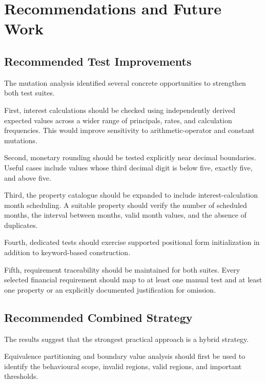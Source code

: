 \documentclass[12pt]{article}
\begin{document}

\section{Recommendations and Future Work}

\subsection{Recommended Test Improvements}

The mutation analysis identified several concrete opportunities to strengthen
both test suites.

First, interest calculations should be checked using independently derived
expected values across a wider range of principals, rates, and calculation
frequencies. This would improve sensitivity to arithmetic-operator and
constant mutations.

Second, monetary rounding should be tested explicitly near decimal boundaries.
Useful cases include values whose third decimal digit is below five, exactly
five, and above five.

Third, the property catalogue should be expanded to include
interest-calculation month scheduling. A suitable property should verify the
number of scheduled months, the interval between months, valid month values,
and the absence of duplicates.

Fourth, dedicated tests should exercise supported positional form
initialization in addition to keyword-based construction.

Fifth, requirement traceability should be maintained for both suites. Every
selected financial requirement should map to at least one manual test and at
least one property or an explicitly documented justification for omission.

\subsection{Recommended Combined Strategy}

The results suggest that the strongest practical approach is a hybrid strategy.

Equivalence partitioning and boundary value analysis should first be used to
identify the behavioural scope, invalid regions, valid regions, and important
thresholds.
\end{document}
